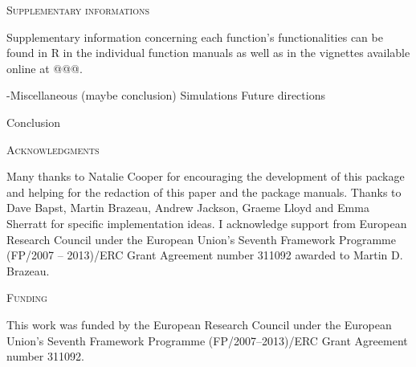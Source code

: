 \documentclass[12pt,letterpaper]{article}
\renewcommand{\section}[1]{%
\bigskip
\begin{center}
\begin{Large}
\normalfont\scshape #1
\medskip
\end{Large}
\end{center}}
\begin{document}





\section{Supplementary informations}
Supplementary information concerning each function's functionalities can be found in R in the individual function manuals as well as in the vignettes available online at @@@.


-Miscellaneous (maybe conclusion)
Simulations
Future directions




Conclusion



\section{Acknowledgments}
Many thanks to Natalie Cooper for encouraging the development of this package and helping for the redaction of this paper and the package manuals.
Thanks to Dave Bapst, Martin Brazeau, Andrew Jackson, Graeme Lloyd and Emma Sherratt for specific implementation ideas.
I acknowledge support from European Research Council under the European Union's Seventh Framework Programme (FP/2007 – 2013)/ERC Grant Agreement number 311092 awarded to Martin D. Brazeau.

\section{Funding}
This work was funded by the European Research Council under the European Union's Seventh Framework Programme (FP/2007–2013)/ERC Grant Agreement number 311092.



\end{document}
